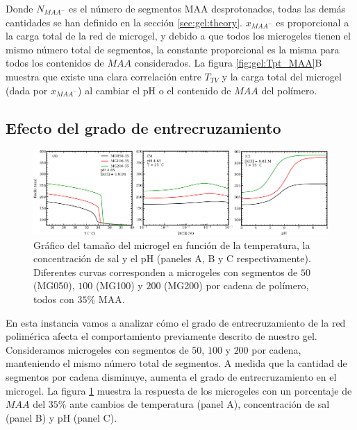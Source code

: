 Donde $N_{MAA^-}$ es el n\'umero de segmentos MAA desprotonados, todas las dem\'as cantidades se han definido en la secci\'on \ref{sec:gel:theory}. $x_{MAA^-}$ es proporcional a la carga total de la red de microgel, y debido a que todos los microgeles tienen el mismo n\'umero total de segmentos, la constante proporcional es la misma para todos los contenidos de $MAA$ considerados. La figura \ref{fig:gel:Tpt_MAA}B muestra que existe una clara correlaci\'on entre $T_{TV}$ y la carga total del microgel (dada por $x_{MAA^-}$) al cambiar el pH o el contenido de $MAA$ del pol\'imero.


\subsection{Efecto del grado de entrecruzamiento} \label{sec:gel:entrecruzamiento}


\begin{figure}[!tb]
	\centering
	\includegraphics[width=1\linewidth]{Figures/graph-gel/R-all_xlink.pdf}
	\caption{Gr\'afico del tama\~no del microgel en funci\'on de la temperatura, la concentraci\'on de sal y el pH (paneles A, B y C respectivamente).
		Diferentes curvas corresponden a microgeles con segmentos de $50$ (MG050), $100$ (MG100) y $200$ (MG200) por cadena de pol\'imero, todos con $35\%$ MAA.}
	\label{fig:gel:R_xlink}
\end{figure}

En esta instancia vamos a analizar c\'omo el grado de entrecruzamiento de la red polim\'erica afecta el comportamiento previamente descrito de nuestro gel. Consideramos microgeles con segmentos de $50$, $100$ y $200$ por cadena, manteniendo el mismo n\'umero total de segmentos. A medida que la cantidad de segmentos por cadena disminuye, aumenta el grado de entrecruzamiento en el microgel. La figura \ref{fig:gel:R_xlink} muestra la respuesta de los microgeles con un porcentaje de $MAA$ del $35\%$ ante cambios de temperatura (panel A), concentraci\'on de sal (panel B) y pH (panel C).

